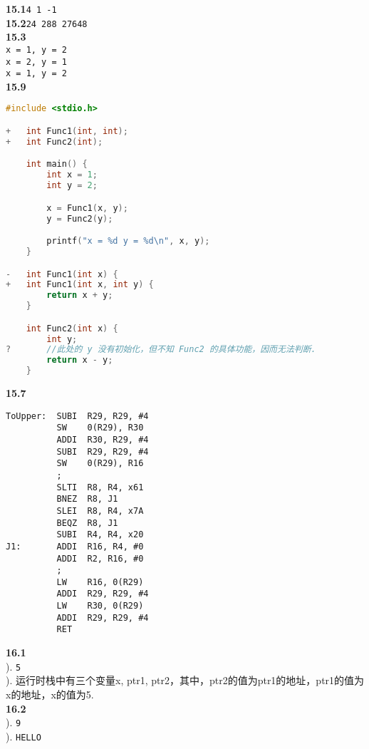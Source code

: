 ﻿\documentclass[UTF8]{ctexart}
\begin{document}
\pagestyle{main}
\noindent\textbf{15.1}\quad\texttt{4 1 -1}\\
\noindent\textbf{15.2}\quad\texttt{24 288 27648}\\
\noindent\textbf{15.3}\\
\indent\texttt{x = 1, y = 2}\\
\indent\texttt{x = 2, y = 1}\\
\indent\texttt{x = 1, y = 2}\\
\noindent\textbf{15.9}
\linespread{1}
\begin{lstlisting}[language=C]
    #include <stdio.h>

+   int Func1(int, int);
+   int Func2(int);

    int main() {
        int x = 1;
        int y = 2;

        x = Func1(x, y);
        y = Func2(y);

        printf("x = %d y = %d\n", x, y);
    }

-   int Func1(int x) {
+   int Func1(int x, int y) {
        return x + y;
    }

    int Func2(int x) {
        int y;
?       //此处的 y 没有初始化，但不知 Func2 的具体功能，因而无法判断.
        return x - y;
    }
\end{lstlisting}

\noindent\textbf{15.7}
\begin{lstlisting}[numbers = none]
ToUpper:  SUBI  R29, R29, #4
          SW    0(R29), R30
          ADDI  R30, R29, #4
          SUBI  R29, R29, #4
          SW    0(R29), R16
          ;
          SLTI  R8, R4, x61
          BNEZ  R8, J1
          SLEI  R8, R4, x7A
          BEQZ  R8, J1
          SUBI  R4, R4, x20
J1:       ADDI  R16, R4, #0
          ADDI  R2, R16, #0
          ;
          LW    R16, 0(R29)
          ADDI  R29, R29, #4
          LW    R30, 0(R29)
          ADDI  R29, R29, #4
          RET
\end{lstlisting}

\pagebreak

\linespread{1.5}
\noindent\textbf{16.1}\\
). \texttt{5}\\
). 运行时栈中有三个变量x, ptr1, ptr2，其中，ptr2的值为ptr1的地址，ptr1的值为x的地址，x的值为5.\\

\noindent\textbf{16.2}\\
). \texttt{9}\\
). \texttt{HELLO}
\end{document}
